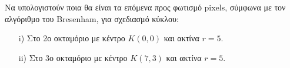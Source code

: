 \begin{exercise}
	Να υπολογιστούν ποια θα είναι τα επόμενα προς φωτισμό pixels, σύμφωνα με τον αλγόριθμο του Bresenham, για σχεδιασμό κύκλου: 
\begin{enumerate}
  \item[i)] Στο 2ο οκταμόριο με  κέντρο $K(0,0)$ και ακτίνα $r=5$.
  \item[ii)] Στο 3ο οκταμόριο με  κέντρο $K(7,3)$ και ακτίνα $r=5$.
\end{enumerate}
		
\end{exercise}

